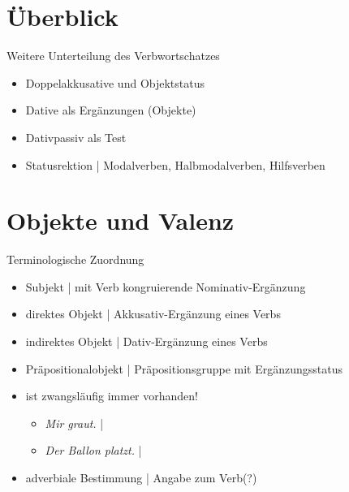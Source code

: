 \section{Überblick}

\begin{frame}
  {Weitere Unterteilung des Verbwortschatzes}
  \onslide<+->
  \begin{itemize}[<+->]
    \item \alert{Doppelakkusative} und Objektstatus
      \Zeile
    \item \alert{Dative} als Ergänzungen (Objekte)
    \item Dativpassiv als Test
      \Zeile
    \item \alert{Statusrektion} | Modalverben, Halbmodalverben, Hilfsverben
  \end{itemize}
\end{frame}

\section{Objekte und Valenz}

\begin{frame}
  {Terminologische Zuordnung}
  \onslide<+->
  \begin{itemize}[<+->]
    \item \alert{Subjekt} | mit Verb kongruierende Nominativ-Ergänzung
    \item \alert{direktes Objekt} | Akkusativ-Ergänzung eines Verbs
    \item \alert{indirektes Objekt} | Dativ-Ergänzung eines Verbs
    \item \alert{Präpositionalobjekt} | Präpositionsgruppe mit Ergänzungsstatus
      \Zeile
    \item {} ist zwangsläufig immer vorhanden!
      \begin{itemize}[<+->]
        \item \textit{Mir graut.} | 
        \item \textit{Der Ballon platzt.} | 
      \end{itemize}
      \Zeile
    \item \alert{adverbiale Bestimmung} | Angabe zum Verb(?)
  \end{itemize}
\end{frame}

